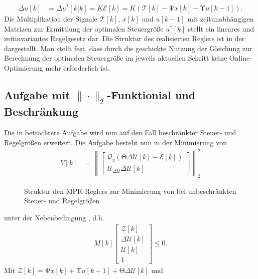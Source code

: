 \begin{remark}
\begin{align*}
	\Delta u[k] & = \Delta u^{\ast}[k|k] = K\mathcal{E}[k]=K\left(\mathcal{T}[k]-\mathrm{\Psi} x[k]-\mathrm{\Upsilon} u[k-1]\right).
\end{align*}
Die Multiplikation der Signale $\mathcal{T}[k]$, $x[k]$ und $u[k-1]$ mit zeitunabhängigen Matrizen zur Ermittlung der optimalen Steuergröße $u^{\ast}[k]$ stellt ein lineares und
zeitinvariantes Regelgesetz dar. Die Struktur des realisierten Reglers ist in der  dargestellt. Man stellt fest, dass durch die geschickte
Nutzung der Gleichung  zur Berechnung der optimalen Steuergröße im jeweils aktuellen Schritt keine Online-Optimierung mehr erforderlich ist.
\end{remark}

\subsection{Aufgabe mit $\|\cdot\|_2$-Funktionial und Beschränkung}
\label{subsec:aufgabe_quad_mit_beschr}
Die in  betrachtete Aufgabe wird nun auf den Fall beschränkter Steuer- und Regelgrößen erweitert. Die Aufgabe besteht nun in der
Minimierung von 
\begin{align}
V[k] & = \left\| \begin{bmatrix}
	\mathcal{Q}_y \left(\mathrm{\Theta}\Delta\mathcal{U}[k]-\mathcal{E}[k] \right)\\
	\mathcal{U}_{\Delta\mathcal{U}}\Delta\mathcal{U}[k]
\end{bmatrix} \right\|_2^2
\end{align}
\begin{figure}[htb]
	\centering
	
	\caption{Struktur den \ac{MPR}-Reglers zur Minimierung von  bei unbeschränkten Steuer- und Regelgrößen}
	\label{fig:kap_4_struktur_mpr}
\end{figure}
unter der Nebenbedingung , d.h.
\begin{align}
	M[k]\begin{bmatrix}
	\mathcal{Z}[k]\\ \Delta\mathcal{U}[k]\\ \mathcal{U}[k]\\ 1
	\end{bmatrix}\le 0. \label{eqn:kap_4_nebenbedinungen_beschr}
\end{align}
Mit $\mathcal{Z}[k]=\mathrm{\Psi} x[k]+\mathrm{\Upsilon} u[k-1]+\mathrm{\Theta}\Delta\mathcal{U}[k]$ und
